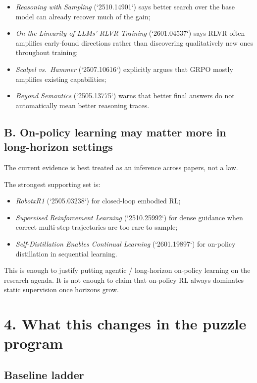 \documentclass[11pt]{article}
\begin{document}
\begin{itemize}
\item \emph{Reasoning with Sampling} (`2510.14901`) says better search over the base model can already recover much of the gain;
\item \emph{On the Linearity of LLMs' RLVR Training} (`2601.04537`) says RLVR often amplifies early-found directions rather than discovering qualitatively new ones throughout training;
\item \emph{Scalpel vs.\ Hammer} (`2507.10616`) explicitly argues that GRPO mostly amplifies existing capabilities;
\item \emph{Beyond Semantics} (`2505.13775`) warns that better final answers do not automatically mean better reasoning traces.
\end{itemize}

\subsection*{B. On-policy learning may matter more in long-horizon settings}

The current evidence is best treated as an inference across papers, not a law.

The strongest supporting set is:

\begin{itemize}
\item \emph{RobotxR1} (`2505.03238`) for closed-loop embodied RL;
\item \emph{Supervised Reinforcement Learning} (`2510.25992`) for dense guidance when correct multi-step trajectories are too rare to sample;
\item \emph{Self-Distillation Enables Continual Learning} (`2601.19897`) for on-policy distillation in sequential learning.
\end{itemize}

This is enough to justify putting agentic / long-horizon on-policy learning on the research agenda. It is not enough to claim that on-policy RL always dominates static supervision once horizons grow.

\section*{4. What this changes in the puzzle program}

\subsection*{Baseline ladder}
\end{document}
